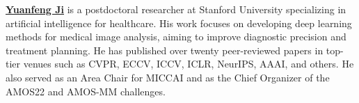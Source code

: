 \documentclass{article}
\begin{document}

\textbf{\href{https://example.com/haibao}{Yuanfeng Ji}} is a postdoctoral researcher at Stanford University specializing in artificial intelligence for healthcare. His work focuses on developing deep learning methods for medical image analysis, aiming to improve diagnostic precision and treatment planning. He has published over twenty peer-reviewed papers in top-tier venues such as CVPR, ECCV, ICCV, ICLR, NeurIPS, AAAI, and others. He also served as an Area Chair for MICCAI and as the Chief Organizer of the AMOS22 and AMOS-MM challenges. 
\end{document}
